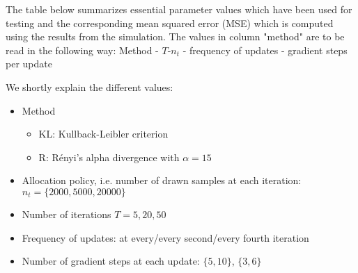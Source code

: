 

The table below summarizes essential parameter values which have been used for testing and the corresponding mean squared error (MSE) which is computed using the results from the simulation. 
The values in column "method" are to be read in the following way:
Method - $T$-$n_t$ - frequency of updates - gradient steps per update

We shortly explain the different values:
\begin{itemize}
    \item Method
    \begin{itemize}
        \item KL: Kullback-Leibler criterion
        \item R: Rényi's alpha divergence with $\alpha = 15$
    \end{itemize}
    \item Allocation policy, i.e. number of drawn samples at each iteration: $n_t = \{2000, 5000, 20000\}$
    \item Number of iterations $T = {5,20,50}$
    \item Frequency of updates:  at every/every second/every fourth iteration
    \item Number of gradient steps at each update: $\{5, 10\}$, $\{3,6\}$
\end{itemize}


